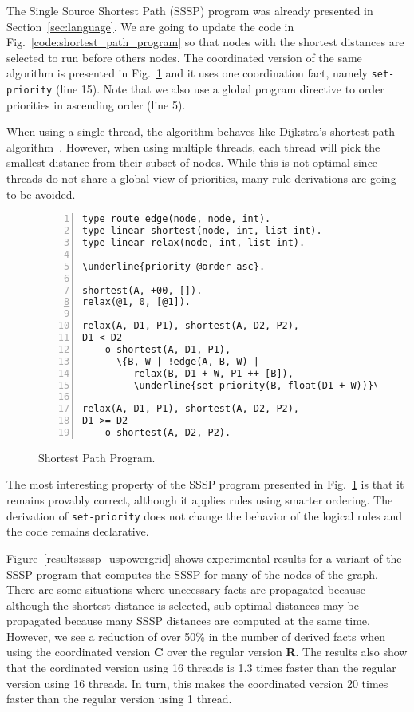 The Single Source Shortest Path (SSSP) program was already presented in
Section~\ref{sec:language}. We are going to update the code in
Fig.~\ref{code:shortest_path_program} so that nodes with the shortest distances
are selected to run before others nodes. The coordinated version of the same
algorithm is presented in Fig.~\ref{code:shortest_path_program_coord} and it
uses one coordination fact, namely \texttt{set-priority} (line 15). Note that we
also use a global program directive to order priorities in ascending order (line
5).

When using a single thread, the algorithm behaves like
Dijkstra's shortest path algorithm~\cite{Dijkstra}. However, when using multiple
threads, each thread will pick the smallest distance from their subset of nodes.
While this is not optimal since threads do not share a global view of priorities,
many rule derivations are going to be avoided.

\begin{figure}[h!]
\scriptsize\begin{Verbatim}[numbers=left,commandchars=\\\{\}]
type route edge(node, node, int).
type linear shortest(node, int, list int).
type linear relax(node, int, list int).

\underline{priority @order asc}.

shortest(A, +00, []).
relax(@1, 0, [@1]).

relax(A, D1, P1), shortest(A, D2, P2),
D1 < D2
   -o shortest(A, D1, P1),
      \{B, W | !edge(A, B, W) |
         relax(B, D1 + W, P1 ++ [B]),
         \underline{set-priority(B, float(D1 + W))}\}.

relax(A, D1, P1), shortest(A, D2, P2),
D1 >= D2
   -o shortest(A, D2, P2).
\end{Verbatim}
  \caption{Shortest Path Program.}
  \label{code:shortest_path_program_coord}
\end{figure}
\normalsize

The most interesting property of the SSSP program presented in
Fig.~\ref{code:shortest_path_program_coord} is that it remains provably correct,
although it applies rules using smarter ordering. The derivation of
\texttt{set-priority} does not change the behavior of the logical rules and the
code remains declarative.

Figure~\ref{results:sssp_uspowergrid} shows experimental results for a variant of
the SSSP program that computes the SSSP for many of the nodes of the graph.
There are some situations where unecessary facts are propagated
because although the shortest distance is selected, sub-optimal distances may be
propagated because many SSSP distances are computed at the same time.
However, we see a reduction of over 50\% in the number of
derived facts when using the coordinated version \textbf{C} over the regular
version \textbf{R}. The results also show that the cordinated
version using 16 threads is 1.3 times faster than the regular version using 16
threads. In turn, this makes the coordinated version 20 times faster
than the regular version using 1 thread.


